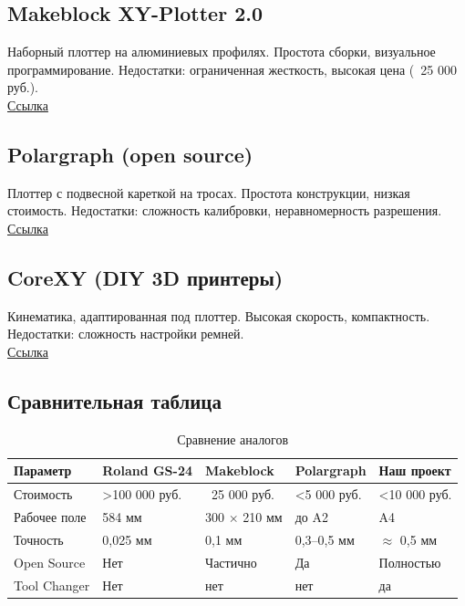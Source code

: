 \documentclass[a4paper,12pt]{article}
\begin{document}
\subsection*{Makeblock XY-Plotter 2.0}
Наборный плоттер на алюминиевых профилях. Простота сборки, визуальное программирование. Недостатки: ограниченная жесткость, высокая цена (~25 000 руб.).\\
\href{https://www.makeblock.com/xy-plotter-robot-kit}{Ссылка}
	
\subsection*{Polargraph (open source)}
Плоттер с подвесной кареткой на тросах. Простота конструкции, низкая стоимость. Недостатки: сложность калибровки, неравномерность разрешения.\\
\href{http://www.polargraph.co.uk/}{Ссылка}
	
\subsection*{CoreXY (DIY 3D принтеры)}
Кинематика, адаптированная под плоттер. Высокая скорость, компактность. Недостатки: сложность настройки ремней.\\
\href{https://reprap.org/wiki/CoreXY}{Ссылка}
	
\subsection*{Сравнительная таблица}
\begin{table}[H]
	\centering
	\caption{Сравнение аналогов}
	\begin{tabular}{|p{3cm}|p{2.2cm}|p{2.2cm}|p{2.2cm}|p{2.2cm}|}
		\hline
		\textbf{Параметр} & \textbf{Roland GS-24} & \textbf{Makeblock} & \textbf{Polargraph} & \textbf{Наш проект} \\
		\hline
		Стоимость & >100 000 руб. & ~25 000 руб. & <5 000 руб. & <10 000 руб. \\
		\hline
		Рабочее поле & 584 мм & 300 $\times$ 210 мм & до A2 & A4 \\
		\hline
		Точность & 0,025 мм & 0,1 мм & 0,3--0,5 мм & $\approx$ 0,5 мм \\
		\hline
		Open Source & Нет & Частично & Да & Полностью \\
		\hline
		Tool Changer & Нет & нет & нет & да \\
		\hline
	\end{tabular}
\end{table}
\end{document}
